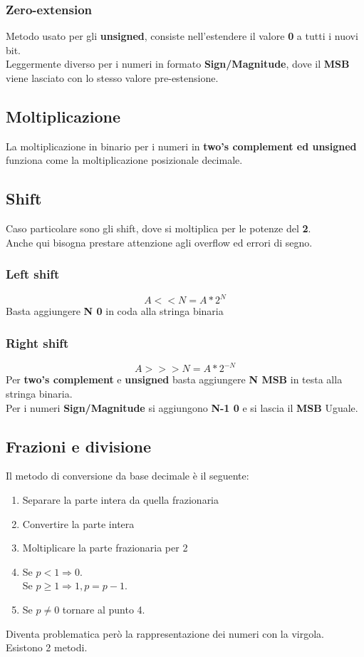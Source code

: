 \documentclass{report}
\begin{document}
        \subsubsection{Zero-extension}
            Metodo usato per gli \textbf{unsigned}, consiste nell'estendere il 
            valore \textbf{0} a tutti i nuovi bit. \\
            Leggermente diverso per i numeri in formato \textbf{Sign/Magnitude}, 
            dove il \textbf{MSB} viene lasciato con lo stesso valore pre-estensione.
    \newpage
    \subsection{Moltiplicazione}
        La moltiplicazione in binario per i numeri in \textbf{two's complement ed unsigned}
        funziona come la moltiplicazione posizionale decimale.
    \subsection{Shift}
        Caso particolare sono gli shift, dove si moltiplica per le potenze del \textbf{2}. \\
        Anche qui bisogna prestare attenzione agli overflow ed errori di segno.
        \subsubsection{Left shift}
            $$A << N = A * 2^N$$
            Basta aggiungere \textbf{N 0} in coda alla stringa binaria
        \subsubsection{Right shift}
            $$A >>> N = A * 2^{-N}$$
            Per \textbf{two's complement} e \textbf{unsigned} basta aggiungere
            \textbf{N MSB} in testa alla stringa binaria. \\
            Per i numeri \textbf{Sign/Magnitude} si aggiungono \textbf{N-1 0} e
            si lascia il \textbf{MSB} Uguale.
    \newpage
    \subsection{Frazioni e divisione}
    Il metodo di conversione da base decimale è il seguente:
    \begin{enumerate}
            \item Separare la parte intera da quella frazionaria
            \item Convertire la parte intera
            \item Moltiplicare la parte frazionaria per 2
            \item Se $p < 1 \Longrightarrow 0$. \\
                Se $p \geq 1 \Longrightarrow 1, p = p - 1$.
            \item Se $p \neq 0$ tornare al punto 4.
    \end{enumerate} 
    Diventa problematica però la rappresentazione dei numeri con la virgola. \\
    Esistono 2 metodi.
\end{document}
